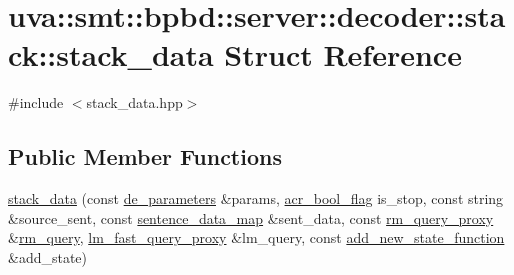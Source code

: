 \hypertarget{structuva_1_1smt_1_1bpbd_1_1server_1_1decoder_1_1stack_1_1stack__data}{}\section{uva\+:\+:smt\+:\+:bpbd\+:\+:server\+:\+:decoder\+:\+:stack\+:\+:stack\+\_\+data Struct Reference}
\label{structuva_1_1smt_1_1bpbd_1_1server_1_1decoder_1_1stack_1_1stack__data}


{\ttfamily \#include $<$stack\+\_\+data.\+hpp$>$}

\subsection*{Public Member Functions}
\begin{DoxyCompactItemize}
\item 
\hyperlink{structuva_1_1smt_1_1bpbd_1_1server_1_1decoder_1_1stack_1_1stack__data_acf9ef447922187aac5fb4febcc82932d}{stack\+\_\+data} (const \hyperlink{namespaceuva_1_1smt_1_1bpbd_1_1server_1_1decoder_aaf4d5faf3a48156401c854d163d4b848}{de\+\_\+parameters} \&params, \hyperlink{namespaceuva_1_1utils_1_1threads_a1c174d3a90b2b056554d897188ad2c74}{acr\+\_\+bool\+\_\+flag} is\+\_\+stop, const string \&source\+\_\+sent, const \hyperlink{namespaceuva_1_1smt_1_1bpbd_1_1server_1_1decoder_1_1sentence_a95d9e3bcc492d0c638368631e3701ebb}{sentence\+\_\+data\+\_\+map} \&sent\+\_\+data, const \hyperlink{classuva_1_1smt_1_1bpbd_1_1server_1_1rm_1_1proxy_1_1rm__query__proxy}{rm\+\_\+query\+\_\+proxy} \&\hyperlink{classuva_1_1smt_1_1bpbd_1_1server_1_1rm_1_1models_1_1rm__query}{rm\+\_\+query}, \hyperlink{classuva_1_1smt_1_1bpbd_1_1server_1_1lm_1_1proxy_1_1lm__fast__query__proxy}{lm\+\_\+fast\+\_\+query\+\_\+proxy} \&lm\+\_\+query, const \hyperlink{namespaceuva_1_1smt_1_1bpbd_1_1server_1_1decoder_1_1stack_a3e1bb866f9fdf44bb23786748b3c791a}{add\+\_\+new\+\_\+state\+\_\+function} \&add\+\_\+state)
\end{DoxyCompactItemize}
